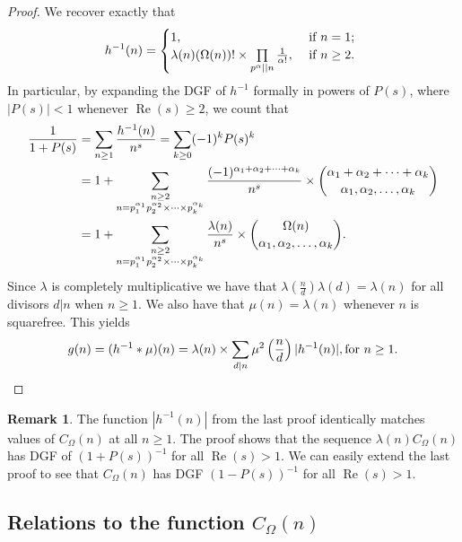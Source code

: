 \documentclass[11pt,reqno,a4letter]{article}
\numberwithin{equation}{section}
\numberwithin{figure}{section}
\numberwithin{table}{section}
\newcommand{\cf}{cf.~}
\theoremstyle{plain}
\numberwithin{theorem}{section}
\theoremstyle{definition}
\newtheorem{remark}[theorem]{Remark}
\theoremstyle{remark}
\renewcommand{\Re}{\operatorname{Re}}
\newcommand{\mathtext}[1]{\text{\rm #1}}
\begin{document}
\begin{proof}
We recover exactly that \cite[\cf \S 2]{FROBERG-1968} 
\begin{equation} 
\notag 
h^{-1}(n) = \begin{cases} 
     1, & \text{ if $n = 1$; } \\ 
     \lambda(n) (\Omega(n))! \times \prod\limits_{p^{\alpha} || n} \frac{1}{\alpha!}, & 
     \text{ if $n \geq 2$. }
     \end{cases}
\end{equation} 
In particular, by expanding the DGF of 
$h^{-1}$ formally in powers of $P(s)$, where $|P(s)| < 1$ whenever $\Re(s) \geq 2$, 
we count that 
\begin{align}
\notag
\frac{1}{1+P(s)} & = \sum_{n \geq 1} \frac{h^{-1}(n)}{n^s} = \sum_{k \geq 0} (-1)^k P(s)^k \\ 
\notag
     & = 
     1 + \sum_{\substack{n \geq 2 \\ n =p_1^{\alpha_1}p_2^{\alpha_2} \times \cdots \times p_k^{\alpha_k}}} 
     \frac{(-1)^{\alpha_1+\alpha_2+\cdots+\alpha_k}}{n^s} \times 
     \binom{\alpha_1+\alpha_2+\cdots+\alpha_k}{\alpha_1,\alpha_2,\ldots,\alpha_k} \\ 
\label{eqn_COmeganMultinomExp_as_DGFSeries_v2}
     & = 
     1 + \sum_{\substack{n \geq 2 \\ n =p_1^{\alpha_1}p_2^{\alpha_2} \times \cdots \times p_k^{\alpha_k}}} 
     \frac{\lambda(n)}{n^s} \times \binom{\Omega(n)}{\alpha_1,\alpha_2,\ldots,\alpha_k}. 
\end{align}
Since $\lambda$ is completely multiplicative we have that 
$\lambda\left(\frac{n}{d}\right) \lambda(d) = \lambda(n)$ for all divisors 
$d|n$ when $n \geq 1$. We also have that $\mu(n) = \lambda(n)$ 
whenever $n$ is squarefree. This yields 
\[
g(n) = (h^{-1} \ast \mu)(n) = \lambda(n) \times 
     \sum_{d|n} \mu^2\left(\frac{n}{d}\right) |h^{-1}(n)|, \mathtext{ for } n \geq 1. 
     \qedhere 
\]
\end{proof} 

\begin{remark}
The function $|h^{-1}(n)|$ from the last proof identically matches  
values of $C_{\Omega}(n)$ at all $n \geq 1$. 
The proof shows that the sequence $\lambda(n) C_{\Omega}(n)$ has 
DGF of $(1 + P(s))^{-1}$ for all $\Re(s) > 1$. We can easily extend the last proof to 
see that $C_{\Omega}(n)$ has DGF $(1-P(s))^{-1}$ for all $\Re(s) > 1$. 
\end{remark}

\subsection{Relations to the function $C_{\Omega}(n)$} 
\label{Section_InvFunc_PreciseExpsAndAsymptotics} 
\label{subSection_Relating_CknFuncs_to_gInvn} 
\end{document}
